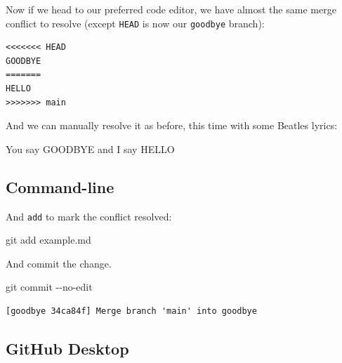 \documentclass[
  letterpaper,
  DIV=11,
  numbers=noendperiod]{scrartcl}
\newenvironment{Shaded}{\begin{snugshade}}{\end{snugshade}}
\newcommand{\AttributeTok}[1]{\textcolor[rgb]{0.40,0.45,0.13}{#1}}
\newcommand{\FunctionTok}[1]{\textcolor[rgb]{0.28,0.35,0.67}{#1}}
\newcommand{\NormalTok}[1]{\textcolor[rgb]{0.00,0.23,0.31}{#1}}
\begin{document}
Now if we head to our preferred code editor, we have almost the same
merge conflict to resolve (except \texttt{HEAD} is now our
\texttt{goodbye} branch):

\begin{verbatim}
<<<<<<< HEAD
GOODBYE
=======
HELLO
>>>>>>> main
\end{verbatim}

And we can manually resolve it as before, this time with some Beatles
lyrics:

\begin{tcolorbox}[enhanced jigsaw, opacitybacktitle=0.6, arc=.35mm, toprule=.15mm, leftrule=.75mm, colbacktitle=quarto-callout-note-color!10!white, bottomrule=.15mm, rightrule=.15mm, opacityback=0, title=\textcolor{quarto-callout-note-color}{\faInfo}\hspace{0.5em}{example.md}, toptitle=1mm, breakable, left=2mm, colback=white, titlerule=0mm, bottomtitle=1mm, coltitle=black, colframe=quarto-callout-note-color-frame]

You say GOODBYE and I say HELLO

\end{tcolorbox}

\subsection{Command-line}

And \texttt{add} to mark the conflict resolved:

\begin{Shaded}
\begin{Highlighting}[]
\FunctionTok{git}\NormalTok{ add example.md}
\end{Highlighting}
\end{Shaded}

And commit the change.

\begin{Shaded}
\begin{Highlighting}[]
\FunctionTok{git}\NormalTok{ commit }\AttributeTok{{-}{-}no{-}edit}
\end{Highlighting}
\end{Shaded}

\begin{verbatim}
[goodbye 34ca84f] Merge branch 'main' into goodbye
\end{verbatim}

\subsection{GitHub Desktop}
\end{document}
